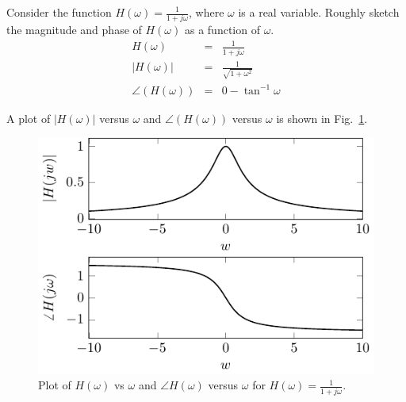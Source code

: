 \begin{example} Consider the function $H(\omega) = \frac{1}{1+j\omega}$, where $\omega$ is a real variable.  Roughly sketch the magnitude and phase of $H(\omega)$ as a function of $\omega$.
\begin{eqnarray}
\nonumber H(\omega) &=& \frac{1}{1+j\omega}\\
\nonumber |H(\omega)| &=& \frac{1}{\sqrt{1+\omega^2}}\\
\nonumber \angle(H(\omega)) &=& 0-\tan^{-1}\omega
\end{eqnarray}

A plot of $|H(\omega)|$ versus $\omega$ and $\angle(H(\omega))$ versus $\omega$ is shown in Fig.~\ref{fig:Homegaexample1}.
\begin{figure}[htbp]
\begin{center}\includegraphics{../Images/ComplexNumbers/Fig_0_6.pdf}\end{center}
\caption{Plot of $H(\omega)$ vs $\omega$ and $\angle H(\omega)$ versus $\omega$ for $H(\omega) = \frac{1}{1+j\omega}$.}
\label{fig:Homegaexample1}
\end{figure}
\end{example}

